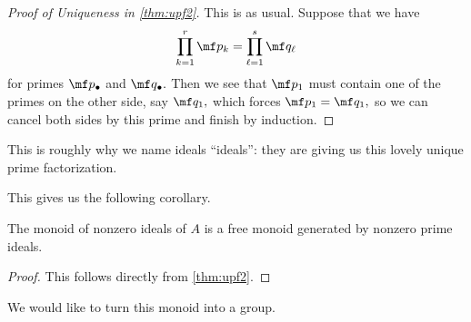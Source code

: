\begin{proof}[Proof of Uniqueness in \autoref{thm:upf2}]
    This is as usual. Suppose that we have
    \[\prod_{k=1}^r\mf p_k=\prod_{\ell=1}^s\mf q_\ell\]
    for primes $\mf p_\bullet$ and $\mf q_\bullet.$ Then we see that $\mf p_1$ must contain one of the primes on the other side, say $\mf q_1,$ which forces $\mf p_1=\mf q_1,$ so we can cancel both sides by this prime and finish by induction.
\end{proof}
\begin{remark}
    This is roughly why we name ideals ``ideals'': they are giving us this lovely unique prime factorization.
\end{remark}
This gives us the following corollary.
\begin{cor}
    The monoid of nonzero ideals of $A$ is a free monoid generated by nonzero prime ideals.
\end{cor}
\begin{proof}
    This follows directly from \autoref{thm:upf2}.
\end{proof}
We would like to turn this monoid into a group.

